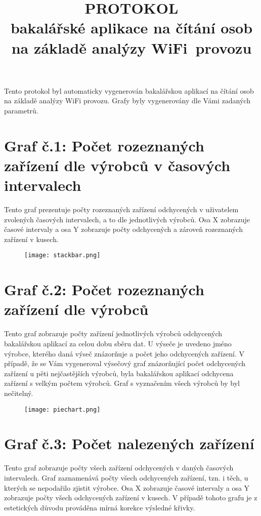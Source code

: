 \documentclass[11pt]{article}
\title{\textbf{PROTOKOL \\ bakalářské aplikace na čítání osob na základě analýzy WiFi~provozu}}
\date{ }
\begin{document}
\maketitle


Tento protokol byl automaticky vygenerován bakalářskou aplikací na čítání osob na základě analýzy WiFi provozu.
Grafy byly vygenerovány dle Vámi zadaných parametrů. 


\vspace{1cm}

\section*{Graf č.1: Počet rozeznaných zařízení dle výrobců v časových intervalech}
Tento graf prezentuje počty rozeznaných zařízení odchycených v uživatelem zvolených časových intervalech, a to dle jednotlivých výrobců. Osa X zobrazuje časové intervaly a osa Y zobrazuje počty odchycených a zároveň rozeznaných zařízení v kusech. 
\vspace{1cm}

\begin{figure}[!h]
  \texttt{[image: stackbar.png]}

\end{figure}


\newpage
  \section*{Graf č.2: Počet rozeznaných zařízení dle výrobců}
  Tento graf zobrazuje počty zařízení jednotlivých výrobců odchycených bakalářskou aplikací za celou dobu sběru dat. U výseče je uvedeno jméno výrobce, kterého daná výseč znázorňuje a počet jeho odchycených zařízení. V případě, že se Vám vygeneroval výsečový graf znázorňující počet odchycených zařízení u pěti nejčastějších výrobců, byla bakalářskou aplikací odchycena zařízení s velkým počtem výrobců. Graf s vyznačením všech výrobců by byl nečitelný. 


  \begin{figure}[!h]
    \texttt{[image: piechart.png]}

  \end{figure}


  \newpage
  \section*{Graf č.3: Počet nalezených zařízení}
  Tento graf zobrazuje počty všech zařízení odchycených v daných časových intervalech. Graf zaznamenává počty všech odchycených zařízení, tzn. i těch, u kterých se nepodařilo zjistit výrobce. Osa X zobrazuje časové intervaly a osa Y zobrazuje počty všech odchycených zařízení v kusech. V případě tohoto grafu je z estetických důvodu prováděna mírná korekce výsledné křivky.
  \vspace{0.5cm}
\end{document}
